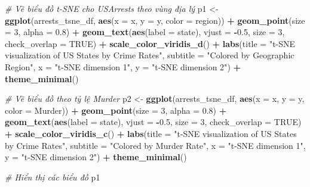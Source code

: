 \documentclass[
]{article}
\newenvironment{Shaded}{\begin{snugshade}}{\end{snugshade}}
\newcommand{\AttributeTok}[1]{\textcolor[rgb]{0.13,0.29,0.53}{#1}}
\newcommand{\CommentTok}[1]{\textcolor[rgb]{0.56,0.35,0.01}{\textit{#1}}}
\newcommand{\ConstantTok}[1]{\textcolor[rgb]{0.56,0.35,0.01}{#1}}
\newcommand{\DecValTok}[1]{\textcolor[rgb]{0.00,0.00,0.81}{#1}}
\newcommand{\FloatTok}[1]{\textcolor[rgb]{0.00,0.00,0.81}{#1}}
\newcommand{\FunctionTok}[1]{\textcolor[rgb]{0.13,0.29,0.53}{\textbf{#1}}}
\newcommand{\NormalTok}[1]{#1}
\newcommand{\OtherTok}[1]{\textcolor[rgb]{0.56,0.35,0.01}{#1}}
\newcommand{\SpecialCharTok}[1]{\textcolor[rgb]{0.81,0.36,0.00}{\textbf{#1}}}
\newcommand{\StringTok}[1]{\textcolor[rgb]{0.31,0.60,0.02}{#1}}
\begin{document}
\begin{Shaded}
\begin{Highlighting}[]
\CommentTok{\# Vẽ biểu đồ t{-}SNE cho USArrests theo vùng địa lý}
\NormalTok{p1 }\OtherTok{\textless{}{-}} \FunctionTok{ggplot}\NormalTok{(arrests\_tsne\_df, }\FunctionTok{aes}\NormalTok{(}\AttributeTok{x =}\NormalTok{ x, }\AttributeTok{y =}\NormalTok{ y, }\AttributeTok{color =}\NormalTok{ region)) }\SpecialCharTok{+}
  \FunctionTok{geom\_point}\NormalTok{(}\AttributeTok{size =} \DecValTok{3}\NormalTok{, }\AttributeTok{alpha =} \FloatTok{0.8}\NormalTok{) }\SpecialCharTok{+}
  \FunctionTok{geom\_text}\NormalTok{(}\FunctionTok{aes}\NormalTok{(}\AttributeTok{label =}\NormalTok{ state), }\AttributeTok{vjust =} \SpecialCharTok{{-}}\FloatTok{0.5}\NormalTok{, }\AttributeTok{size =} \DecValTok{3}\NormalTok{, }\AttributeTok{check\_overlap =} \ConstantTok{TRUE}\NormalTok{) }\SpecialCharTok{+}
  \FunctionTok{scale\_color\_viridis\_d}\NormalTok{() }\SpecialCharTok{+}
  \FunctionTok{labs}\NormalTok{(}\AttributeTok{title =} \StringTok{"t{-}SNE visualization of US States by Crime Rates"}\NormalTok{,}
       \AttributeTok{subtitle =} \StringTok{"Colored by Geographic Region"}\NormalTok{,}
       \AttributeTok{x =} \StringTok{"t{-}SNE dimension 1"}\NormalTok{,}
       \AttributeTok{y =} \StringTok{"t{-}SNE dimension 2"}\NormalTok{) }\SpecialCharTok{+}
  \FunctionTok{theme\_minimal}\NormalTok{()}

\CommentTok{\# Vẽ biểu đồ theo tỷ lệ Murder}
\NormalTok{p2 }\OtherTok{\textless{}{-}} \FunctionTok{ggplot}\NormalTok{(arrests\_tsne\_df, }\FunctionTok{aes}\NormalTok{(}\AttributeTok{x =}\NormalTok{ x, }\AttributeTok{y =}\NormalTok{ y, }\AttributeTok{color =}\NormalTok{ Murder)) }\SpecialCharTok{+}
  \FunctionTok{geom\_point}\NormalTok{(}\AttributeTok{size =} \DecValTok{3}\NormalTok{, }\AttributeTok{alpha =} \FloatTok{0.8}\NormalTok{) }\SpecialCharTok{+}
  \FunctionTok{geom\_text}\NormalTok{(}\FunctionTok{aes}\NormalTok{(}\AttributeTok{label =}\NormalTok{ state), }\AttributeTok{vjust =} \SpecialCharTok{{-}}\FloatTok{0.5}\NormalTok{, }\AttributeTok{size =} \DecValTok{3}\NormalTok{, }\AttributeTok{check\_overlap =} \ConstantTok{TRUE}\NormalTok{) }\SpecialCharTok{+}
  \FunctionTok{scale\_color\_viridis\_c}\NormalTok{() }\SpecialCharTok{+}
  \FunctionTok{labs}\NormalTok{(}\AttributeTok{title =} \StringTok{"t{-}SNE visualization of US States by Crime Rates"}\NormalTok{,}
       \AttributeTok{subtitle =} \StringTok{"Colored by Murder Rate"}\NormalTok{,}
       \AttributeTok{x =} \StringTok{"t{-}SNE dimension 1"}\NormalTok{,}
       \AttributeTok{y =} \StringTok{"t{-}SNE dimension 2"}\NormalTok{) }\SpecialCharTok{+}
  \FunctionTok{theme\_minimal}\NormalTok{()}

\CommentTok{\# Hiển thị các biểu đồ}
\NormalTok{p1}
\end{Highlighting}
\end{Shaded}
\end{document}
